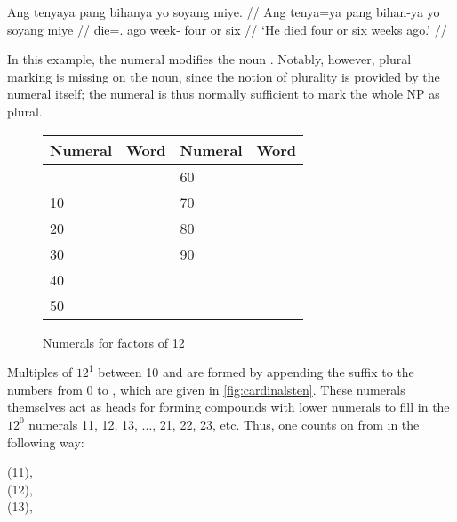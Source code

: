 \ex\label{ex:nummod}
\begingl
	\gla Ang tenyaya pang bihanya yo soyang miye. //
	\glb Ang tenya=ya pang bihan-ya yo soyang miye //
	\glc \AgtT{} die=\TsgM{}.\Top{} ago week-\Loc{} four or six //
	\glft `He died four or six weeks ago.' //
\endgl
\xe

In this example, the numeral  modifies the noun 
. Notably, however, plural marking is missing on the 
noun, since the notion of plurality is provided by the numeral itself; the 
numeral is thus normally sufficient to mark the whole NP as plural.

\begin{figure}[tp]\centering
\caption{Numerals for factors of 12}
\begin{tabu} to .75\linewidth {X[1c] X[2c] X[1c] X[2c]}
\toprule\tableheaderfont
Numeral
	& Word
	& Numeral
	& Word
	\\
\toprule

&
& 60 &  \\

10 & 
& 70 &  \\

20 &   
& 80 &  \\

30 & 
& 90 &  \\

40 & 
&  &  \\

50 & 
&  &  \\

\bottomrule
\end{tabu}
\label{fig:cardinalsten}
\end{figure}

Multiples of $12^1$ between 10 and  are formed by appending the 
suffix  to the numbers from 0 to \elv, which are given in 
\autoref{fig:cardinalsten}. These numerals themselves act as heads for forming 
compounds with lower numerals to fill in the $12^0$ numerals 11, 12, 13, ..., 
21, 22, 23, etc. Thus, one counts on from  in the 
following way:

\pex
\a %
	 (11), \\
	 (12), \\
	 (13),  \medskip
	
